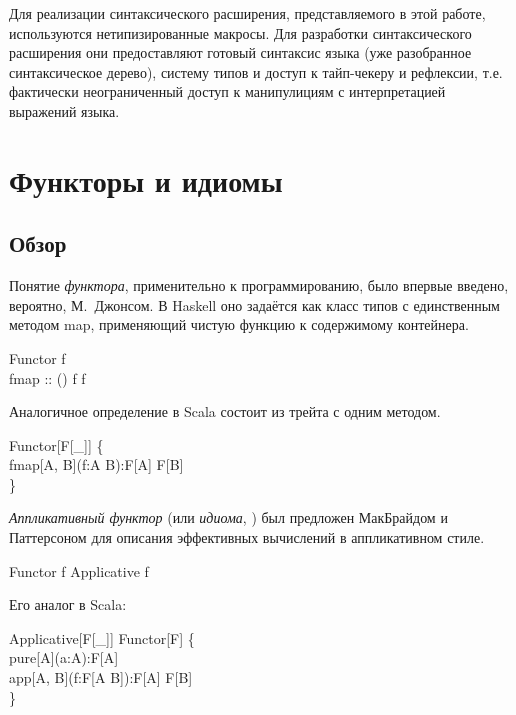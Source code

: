 Для реализации синтаксического расширения, представляемого в этой работе, используются нетипизированные макросы. Для разработки синтаксического расширения они предоставляют готовый синтаксис языка (уже разобранное синтаксическое дерево), систему типов и доступ к тайп-чекеру и рефлексии, т.е. фактически неограниченный доступ к манипулициям с интерпретацией выражений языка.

\chapter{Функторы и идиомы}
\section{Обзор}
Понятие \emph{функтора}, применительно к программированию, было впервые введено, вероятно, М.~Джонсом\cite{Jones1993a}. В Haskell оно задаётся как класс типов с единственным методом \<map\>, применяющий чистую функцию к содержимому контейнера.

\begin{haskell*}
 Functor f  \\
\quad\quad fmap :: (\alpha \to \beta) \to f \alpha \to f \beta
\end{haskell*}

Аналогичное определение в Scala состоит из трейта с одним методом.

\begin{haskell}
 Functor[F[\_]] \{ \\
\quad\quad {} fmap[A, B](f:A \Rightarrow B):F[A] \Rightarrow F[B] \\
\}
\end{haskell}

\emph{Аппликативный функтор} (или \emph{идиома}, ) был предложен МакБрайдом и Паттерсоном\cite{McBride2008} для описания эффективных вычислений в аппликативном стиле.

\begin{haskell*}
 Functor f \Rightarrow Applicative f  \\
\end{haskell*}

Его аналог в Scala:

\begin{haskell}
 Applicative[F[\_]]  Functor[F] \{ \\
\quad\quad {} pure[A](a:A):F[A] \\
\quad\quad {} app[A, B](f:F[A \Rightarrow B]):F[A] \Rightarrow F[B] \\
\}
\end{haskell}

